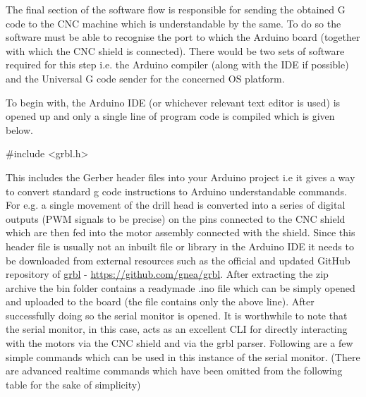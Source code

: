 The final section of the software flow is responsible for sending the obtained G code to the CNC machine which is understandable by the same. To do so the software must be able to recognise the port to which the Arduino board (together with which the CNC shield is connected). There would be two sets of software required for this step i.e. the Arduino compiler (along with the IDE if possible) and the Universal G code sender for the concerned OS platform. \par

To begin with, the Arduino IDE (or whichever relevant text editor is used) is opened up and only a single line of program code is compiled which is given below.

 {\selectfont \#include <grbl.h>}

This includes the Gerber header files into your Arduino project i.e it gives a way to convert standard g code instructions to Arduino understandable commands. For e.g. a single movement of the drill head is converted into a series of digital outputs (PWM signals to be precise) on the pins connected to the CNC shield which are then fed into the motor assembly connected with the shield. Since this header file is usually not an inbuilt file or library in the Arduino IDE it needs to be downloaded from external resources such as the official and updated GitHub repository of \href{https://github.com/gnea/grbl}{grbl} - \url{https://github.com/gnea/grbl}. After extracting the zip archive the bin folder contains a readymade .ino file which can be simply opened and uploaded to the board (the file contains only the above line). After successfully doing so the serial monitor is opened. It is worthwhile to note that the serial monitor, in this case, acts as an excellent CLI for directly interacting with the motors via the CNC shield and via the grbl parser. Following are a few simple commands which can be used in this instance of the serial monitor. (There are advanced realtime commands which have been omitted from the following table for the sake of simplicity) \par

